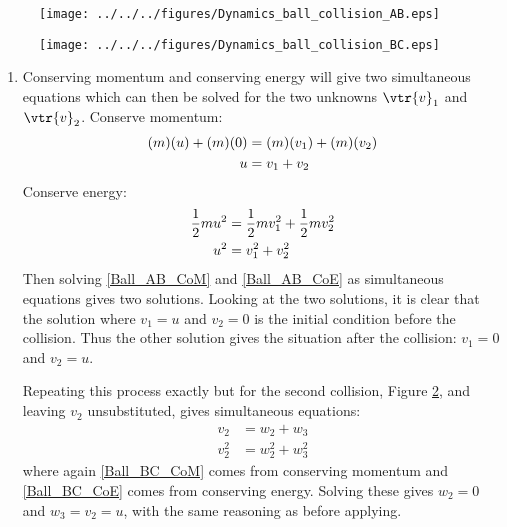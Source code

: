 \begin{problem}[A1969AMIIQ8l]
{\begin{figure}[h]
  \centering
 	\texttt{[image: ../../../figures/Dynamics\_ball\_collision\_AB.eps]}
	\caption{}
	\label{fig:Dynamics_ball_collision_AB}
\end{figure}
\begin{figure}[h]
	\centering
	\texttt{[image: ../../../figures/Dynamics\_ball\_collision\_BC.eps]}
	\caption{}
	\label{fig:Dynamics_ball_collision_BC}
\caption{}
\end{figure}

\begin{enumerate}
	\item Conserving momentum and conserving energy will give two simultaneous equations which can then be solved for the two unknowns $\vtr{v}_{1}$ and $\vtr{v}_{2}$.
Conserve momentum:
\begin{align} \notag (m)(u) + (m)(0) &= (m)(v_{1}) + (m)(v_{2}) \\ u &= v_{1} + v_{2} \label{Ball_AB_CoM}\end{align}
Conserve energy:
\begin{align} \notag \frac{1}{2}mu^{2} &= \frac{1}{2}mv_{1}^{2} + \frac{1}{2}mv_{2}^{2} \\ u^{2} &= v_{1}^{2} + v_{2}^{2} \label{Ball_AB_CoE}\end{align}
Then solving \ref{Ball_AB_CoM} and \ref{Ball_AB_CoE} as simultaneous equations gives two solutions. Looking at the two solutions, it is clear that the solution where $v_{1} = u$ and $v_{2} = 0$ is the initial condition before the collision. Thus the other solution gives the situation after the collision: $v_{1} = 0$ and $v_{2} = u$.

Repeating this process exactly but for the second collision, Figure \ref{fig:Dynamics_ball_collision_BC}, and leaving $v_{2}$ unsubstituted, gives simultaneous equations:
\begin{align} 
v_{2} &= w_{2} + w_{3} \label{Ball_BC_CoM} \\  
v_{2}^{2} &= w_{2}^{2} + w_{3}^{2} \label{Ball_BC_CoE}
\end{align}
where again \ref{Ball_BC_CoM} comes from conserving momentum and \ref{Ball_BC_CoE} comes from conserving energy. Solving these gives $w_{2} = 0$ and $w_{3} = v_{2} = u$, with the same reasoning as before applying.


\end{enumerate}}
\end{problem}
